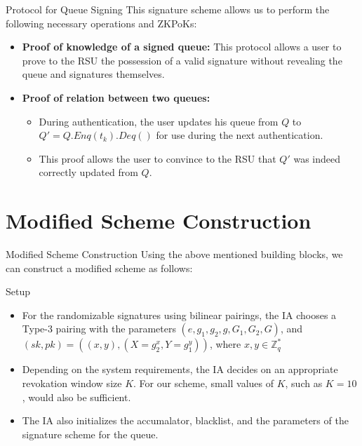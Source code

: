 \documentclass[
	xcolor={svgnames},
	hyperref={pagebackref,bookmarks},
	aspectratio=43,
]{beamer}
\begin{document}
\begin{frame}{Protocol for Queue Signing}
	This signature scheme allows us to perform the following necessary operations and ZKPoKs: 
	\begin{itemize}[<alert@+>]
		\item \textbf{Proof of knowledge of a signed queue: } This protocol allows a user to prove to the RSU the possession of a valid signature without revealing the queue and signatures themselves. 
		\item \textbf{Proof of relation between two queues: }
		\begin{itemize}
			\item During authentication, the user updates his queue from $Q$ to $Q' = Q.Enq(t_k).Deq()$ for use during the next authentication.
			\item This proof allows the user to convince to the RSU that $Q'$ was indeed correctly updated from $Q$.
		\end{itemize}
	\end{itemize}
\end{frame}

\section{Modified Scheme Construction}
\begin{frame}{Modified Scheme Construction}
	Using the above mentioned building blocks, we can construct a modified scheme as follows:
	\begin{block}{Setup}
		\begin{itemize}
			\item For the randomizable signatures using bilinear pairings, the IA chooses a Type-3 pairing with the parameters $(e, g_1, g_2, g, G_1, G_2, G)$, and $(sk, pk) = ((x, y), (X=g_2^x, Y=g_1^y))$, where $x, y \in \mathbb{Z}_q^*$
			\item Depending on the system requirements, the IA decides on an appropriate revokation window size $K$. For our scheme, small values of $K$, such as $K=10$, would also be sufficient.
			\item The IA also initializes the accumalator, blacklist, and the parameters of the signature scheme for the queue.
		\end{itemize}
	\end{block}
\end{frame}
\end{document}
